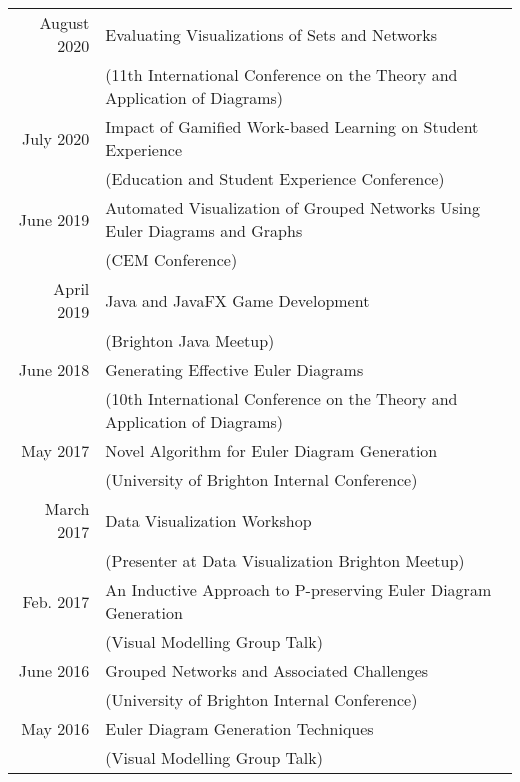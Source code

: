\documentclass[a4paper,11pt]{article} %
\begin{document}
\begin{center}
\begin{tabular}{rl}

August 2020 & Evaluating Visualizations of Sets and Networks\\ & (11th International Conference on the Theory and Application of Diagrams) \\

July 2020 & Impact of Gamified Work-based Learning on Student Experience\\ & (Education and Student Experience Conference)\\

June 2019 & Automated Visualization of Grouped Networks Using Euler Diagrams and Graphs\\ & (CEM Conference) \\

April 2019 & Java and JavaFX Game Development\\ & (Brighton Java Meetup) \\

June 2018 & Generating Effective Euler Diagrams\\ & (10th International Conference on the Theory and Application of Diagrams) \\

May 2017 & Novel Algorithm for Euler Diagram Generation\\ & (University of Brighton Internal Conference) \\

March 2017 & Data Visualization Workshop\\ & (Presenter at Data Visualization Brighton Meetup) \\

Feb. 2017 & An Inductive Approach to P-preserving Euler Diagram Generation\\ & (Visual Modelling Group Talk) \\

June 2016 & Grouped Networks and Associated Challenges\\ & (University of Brighton Internal Conference) \\

May 2016 & Euler Diagram Generation Techniques\\ & (Visual Modelling Group Talk) \\

\end{tabular}
\end{center}
\end{document}
